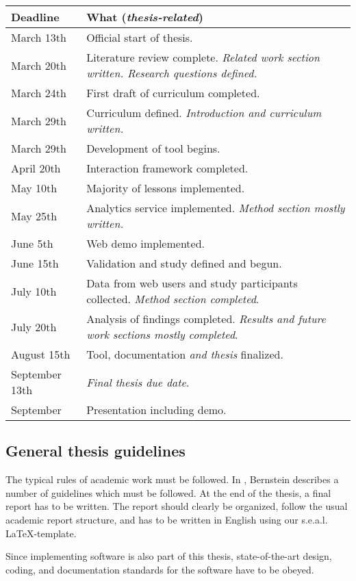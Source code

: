 \documentclass{task_description}
\begin{document}
\begin{tabular}{lp{10cm}}
Deadline & What (\emph{thesis-related}) \\
\hline\noalign{\smallskip}
March 13th   & Official start of thesis. \\
March 20th  & Literature review complete. \emph{Related work section written. Research questions defined.} \\
March 24th  & First draft of curriculum completed. \\
March 29th  & Curriculum defined. \emph{Introduction and curriculum written.} \\
March 29th  & Development of tool begins. \\
April 20th  & Interaction framework completed. \\
May 10th    & Majority of lessons implemented. \\
May 25th    & Analytics service implemented. \emph{Method section mostly written.} \\
June 5th    & Web demo implemented. \\
June 15th   & Validation and study defined and begun. \\
July 10th   & Data from web users and study participants collected. \emph{Method section completed}. \\
July 20th   & Analysis of findings completed. \emph{Results and future work sections mostly completed}. \\
August 15th   & Tool, documentation \emph{and thesis} finalized. \\
September 13th & \emph{Final thesis due date}. \\
September   & Presentation including demo. \\
\end{tabular}

\subsection*{General thesis guidelines}

The typical rules of academic work must be followed. In
\cite{Bernstein2005-daguide}, Bernstein describes a number of guidelines which
must be followed. At the end of the thesis, a final report has to be
written. The report should clearly be organized, follow the usual academic
report structure, and has to be written in English using our
s.e.a.l. \LaTeX-template.

Since implementing software is also part of this thesis, state-of-the-art
design, coding, and documentation standards for the software have to be obeyed.
\end{document}
